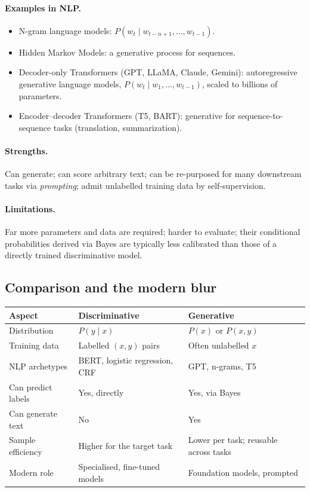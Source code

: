 \paragraph{Examples in NLP.}
\begin{itemize}
    \item N-gram language models: $P(w_t \mid w_{t-n+1}, \dots, w_{t-1})$.
    \item Hidden Markov Models: a generative process for sequences.
    \item Decoder-only Transformers (GPT, LLaMA, Claude, Gemini): autoregressive generative language models, $P(w_t \mid w_1, \dots, w_{t-1})$, scaled to billions of parameters.
    \item Encoder--decoder Transformers (T5, BART): generative for sequence-to-sequence tasks (translation, summarization).
\end{itemize}

\paragraph{Strengths.} Can generate; can score arbitrary text; can be re-purposed for many downstream tasks via \emph{prompting}; admit unlabelled training data by self-supervision.

\paragraph{Limitations.} Far more parameters and data are required; harder to evaluate; their conditional probabilities derived via Bayes are typically less calibrated than those of a directly trained discriminative model.

\subsection{Comparison and the modern blur}

\begin{center}
\begin{tabular}{|l|l|l|}
\hline
\textbf{Aspect} & \textbf{Discriminative} & \textbf{Generative} \\
\hline
Distribution & $P(y \mid x)$ & $P(x)$ or $P(x, y)$ \\
Training data & Labelled $(x, y)$ pairs & Often unlabelled $x$ \\
NLP archetypes & BERT, logistic regression, CRF & GPT, n-grams, T5 \\
Can predict labels & Yes, directly & Yes, via Bayes \\
Can generate text & No & Yes \\
Sample efficiency & Higher for the target task & Lower per task; reusable across tasks \\
Modern role & Specialised, fine-tuned models & Foundation models, prompted \\
\hline
\end{tabular}
\end{center}

